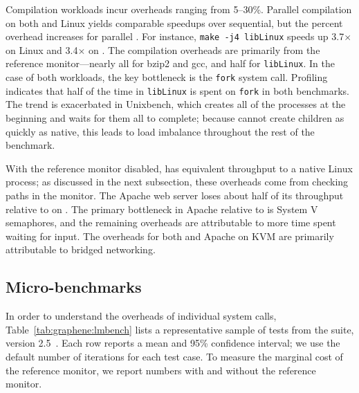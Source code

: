 Compilation workloads incur overheads ranging from 5--30\%.
Parallel compilation on both \sysname{} and Linux yields comparable  speedups  over sequential,
but the percent overhead increases for parallel \sysname{}.
For instance, {\tt make -j4 libLinux} speeds up 3.7$\times$ on Linux and 3.4$\times$ on \sysname{}.
The compilation overheads are primarily from the reference monitor---nearly all for bzip2 and gcc, and half for {\tt libLinux}.
In the case of both \busy{} workloads, the key bottleneck is the {\tt fork} system call.
Profiling indicates that half of the time in {\tt libLinux} is spent on {\tt fork} in both benchmarks.
The trend is exacerbated in Unixbench, which creates all of the processes at the beginning and
waits for them all to complete; because \sysname{} cannot create children as quickly as native, this leads to 
load imbalance throughout the rest of the benchmark.  

With the reference monitor disabled,  \light{} has equivalent throughput to a native Linux process;
as discussed in the next subsection, these overheads come from checking paths in the monitor.
The Apache web server loses about half of its throughput relative to \light{} on \sysname{}.
The primary bottleneck in Apache relative to \light{} is System V semaphores,
and the remaining overheads are attributable to more time spent waiting for input.
The overheads for both \light{} and Apache on KVM are primarily attributable
to bridged networking.





\subsection{Micro-benchmarks}
\label{sec:graphene:eval:micro}

In order to understand the overheads of individual system calls,
Table~\ref{tab:graphene:lmbench} lists 
a representative sample of 
tests from the
\lmbench{} suite, version 2.5~\citep{McVoy:lmbench}.
Each row reports a mean and 95\% confidence interval;
we use the default number of iterations for each test case.
To measure the marginal cost of the reference monitor, we report numbers with and without 
the reference monitor.

